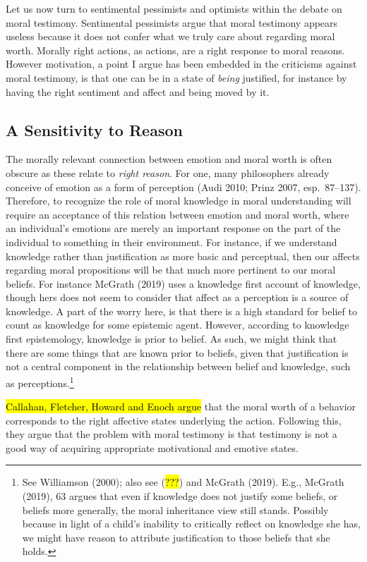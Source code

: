 \documentclass[
  letterpaper,
  DIV=11,
  numbers=noendperiod]{scrartcl}
\theoremstyle{remark}
\begin{document}
Let us now turn to sentimental pessimists and optimists within the
debate on moral testimony. Sentimental pessimists argue that moral
testimony appears useless because it does not confer what we truly care
about regarding moral worth. Morally right actions, as actions, are a
right response to moral reasons. However motivation, a point I argue has
been embedded in the criticisms against moral testimony, is that one can
be in a state of \emph{being} justified, for instance by having the
right sentiment and affect and being moved by it.

\subsection{A Sensitivity to Reason}\label{a-sensitivity-to-reason}

The morally relevant connection between emotion and moral worth is often
obscure as these relate to \emph{right reason}. For one, many
philosophers already conceive of emotion as a form of perception (Audi
2010; Prinz 2007, esp.~87--137). Therefore, to recognize the role of
moral knowledge in moral understanding will require an acceptance of
this relation between emotion and moral worth, where an individual's
emotions are merely an important response on the part of the individual
to something in their environment. For instance, if we understand
knowledge rather than justification as more basic and perceptual, then
our affects regarding moral propositions will be that much more
pertinent to our moral beliefs. For instance McGrath (2019) uses a
knowledge first account of knowledge, though hers does not seem to
consider that affect as a perception is a source of knowledge. A part of
the worry here, is that there is a high standard for belief to count as
knowledge for some epistemic agent. However, according to knowledge
first epistemology, knowledge is prior to belief. As such, we might
think that there are some things that are known prior to beliefs, given
that justification is not a central component in the relationship
between belief and knowledge, such as perceptions.\footnote{See
  Williamson (2000); also see (\hl{???}) and McGrath (2019). E.g.,
  McGrath (2019), 63 argues that even if knowledge does not justify some
  beliefs, or beliefs more generally, the moral inheritance view still
  stands. Possibly because in light of a child's inability to critically
  reflect on knowledge she has, we might have reason to attribute
  justification to those beliefs that she holds.}

\hl{Callahan, Fletcher, Howard and Enoch argue} that the moral worth of
a behavior corresponds to the right affective states underlying the
action. Following this, they argue that the problem with moral testimony
is that testimony is not a good way of acquiring appropriate
motivational and emotive states.
\end{document}
